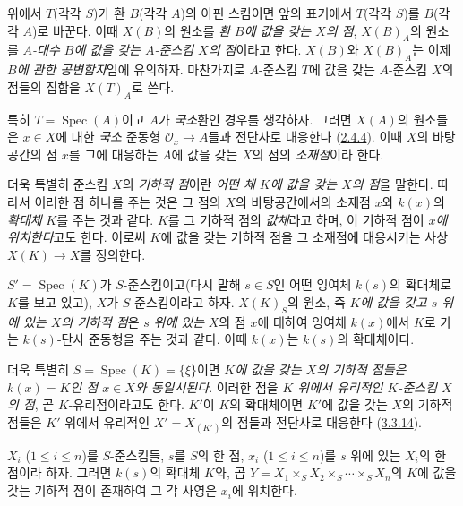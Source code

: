 \begin{env}[3.4.4]
\label{I.3.4.4-ko}
위에서 $T$(각각 $S$)가 환 $B$(각각 $A$)의 아핀 스킴이면 앞의
표기에서 $T$(각각 $S$)를 $B$(각각 $A$)로 바꾼다. 이때 $X(B)$의
원소를 \emph{환 $B$에 값을 갖는 $X$의 점}, $X(B)_A$의 원소를
\emph{$A$-대수 $B$에 값을 갖는 $A$-준스킴 $X$의 점}이라고 한다.
$X(B)$와 $X(B)_A$는 이제 \emph{$B$에 관한 공변함자}임에 유의하자.
마찬가지로 $A$-준스킴 $T$에 값을 갖는 $A$-준스킴 $X$의 점들의
집합을 $X(T)_A$로 쓴다.
\end{env}

\begin{env}[3.4.5]
\label{I.3.4.5-ko}
특히 $T=\operatorname{Spec}(A)$이고 $A$가 \emph{국소}환인 경우를
생각하자. 그러면 $X(A)$의 원소들은 $x\in X$에 대한 \emph{국소}
준동형 $\mathcal O_x\to A$들과 전단사로 대응한다
(\hyperref[I.2.4.4-ko]{2.4.4}). 이때 $X$의 바탕공간의 점 $x$를
그에 대응하는 $A$에 값을 갖는 $X$의 점의 \emph{소재점}이라 한다.

더욱 특별히 준스킴 $X$의 \emph{기하적 점}이란
\emph{어떤 체 $K$에 값을 갖는 $X$의 점}을 말한다. 따라서 이러한
점 하나를 주는 것은 그 점의 $X$의 바탕공간에서의
소재점 $x$와 $k(x)$의 \emph{확대체} $K$를 주는 것과 같다. $K$를
그 기하적 점의 \emph{값체}라고 하며, 이 기하적 점이
\emph{$x$에 위치한다}고도 한다. 이로써 $K$에 값을 갖는 기하적 점을
그 소재점에 대응시키는 사상 $X(K)\to X$를 정의한다.

$S'=\operatorname{Spec}(K)$가 $S$-준스킴이고(다시 말해
$s\in S$인 어떤 잉여체 $k(s)$의 확대체로 $K$를 보고 있고),
$X$가 $S$-준스킴이라고 하자. $X(K)_S$의 원소, 즉
\emph{$K$에 값을 갖고 $s$ 위에 있는 $X$의 기하적 점}은
$s$ \emph{위에 있는} $X$의 점 $x$에 대하여 잉여체 $k(x)$에서
$K$로 가는 $k(s)$-단사 준동형을 주는 것과 같다. 이때 $k(x)$는
$k(s)$의 확대체이다.

더욱 특별히 $S=\operatorname{Spec}(K)=\{\xi\}$이면
\emph{$K$에 값을 갖는 $X$의 기하적 점들은 $k(x)=K$인 점
$x\in X$와 동일시된다}. 이러한 점을 \emph{$K$ 위에서 유리적인
$K$-준스킴 $X$의 점}, 곧 $K$-유리점이라고도 한다. $K'$이 $K$의
확대체이면 $K'$에 값을 갖는 $X$의 기하적 점들은
$K'$ 위에서 유리적인 $X'=X_{(K')}$의 점들과 전단사로 대응한다
(\hyperref[I.3.3.14-ko]{3.3.14}).
\end{env}

\begin{lemma}[3.4.6]
\label{I.3.4.6-ko}
$X_i$ ($1\leq i\leq n$)를 $S$-준스킴들, $s$를 $S$의 한 점,
$x_i$ ($1\leq i\leq n$)를 $s$ 위에 있는 $X_i$의 한 점이라 하자.
그러면 $k(s)$의 확대체 $K$와, 곱
$Y=X_1\times_S X_2\times_S\cdots\times_S X_n$의 $K$에 값을 갖는
기하적 점이 존재하여 그 각 사영은 $x_i$에 위치한다.
\end{lemma}

